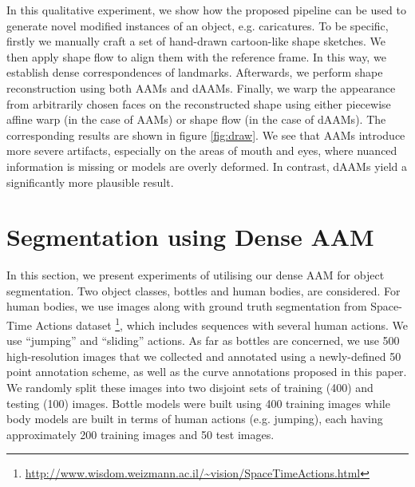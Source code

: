 In this qualitative experiment, we show how the proposed pipeline can be used to generate novel modified instances of an object, e.g. caricatures. To be specific, firstly we manually craft a set of hand-drawn cartoon-like shape sketches. We then apply shape flow to align them with the reference frame. In this way, we establish dense correspondences of landmarks. Afterwards, we perform shape reconstruction using both AAMs and dAAMs. Finally, we warp the appearance from arbitrarily chosen faces on the reconstructed shape using either piecewise affine warp (in the case of AAMs) or shape flow (in the case of dAAMs). The corresponding results are shown in figure \ref{fig:draw}. We see that AAMs introduce more severe artifacts, especially on the areas of mouth and eyes, where nuanced information is missing or models are overly deformed. In contrast, dAAMs yield a significantly more plausible result.



\section{Segmentation using Dense AAM}
\label{sec:segmentation}

In this section, we present experiments of utilising our dense AAM for object segmentation. Two object classes, bottles and human bodies, are considered. For human bodies, we use images along with ground truth segmentation from Space-Time Actions dataset \footnote{\label{sta} \url{http://www.wisdom.weizmann.ac.il/~vision/SpaceTimeActions.html}}, which includes sequences with several human actions. We use ``jumping'' and ``sliding'' actions. As far as bottles are concerned, we use 500 high-resolution images that we collected and annotated using a newly-defined 50 point annotation scheme, as well as the curve annotations proposed in this paper. We randomly split these images into two disjoint sets of training (400) and testing (100) images. Bottle models were built using 400 training images while body models are built in terms of human actions (e.g. jumping), each having approximately 200 training images and 50 test images. 

